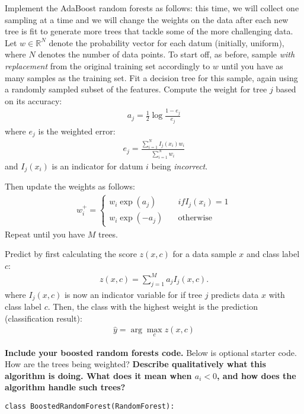 \documentclass[preview]{standalone}
\begin{document}
\begin{Parts}
\Part Implement the AdaBoost random forests as follows: this time, we will collect one sampling at a time and we will change the weights on the data after each new tree is fit to generate more trees that tackle some of the more challenging data. Let $w \in \mathbb{R}^N$ denote the probability vector for each datum (initially, uniform), where $N$ denotes the number of data points. To start off, as before, sample \textit{with replacement} from the original training set accordingly to $w$ until you have as many samples as the training set. Fit a decision tree for this sample, again using a randomly sampled subset of the features. Compute the weight for tree $j$ based on its accuracy:
\begin{align*}
a_j = \frac{1}{2} \log \frac{1-e_j}{e_j}
\end{align*}
where $e_j$ is the weighted error:
\begin{align*} 
e_j = \frac{\sum_{i=1}^N{I_j(x_i) w_i}}{\sum_{i=1}^N{w_i}}
\end{align*} 
and $I_j(x_i)$ is an indicator for datum $i$ being \textit{incorrect}.

Then update the weights as follows:
\begin{align*}
w_i^+ = \begin{cases} w_i \exp(a_j)  & \quad if I_j(x_i) = 1 \\
w_i \exp(-a_j) & \quad \text{otherwise}
\end{cases}
\end{align*}
Repeat until you have $M$ trees.

Predict by first calculating the score $z(x, c)$ for a data sample $x$ and class label $c$:
\begin{align*}
z(x, c) = \sum_{j=1}^M a_j I_{j}(x, c).
\end{align*}
where $I_j(x,c)$ is now an indicator variable for if tree $j$ predicts data $x$ with class label $c$.
Then, the class with the highest weight is the prediction (classification result):
\begin{align*}
\hat{y} = \arg \max_c z(x, c)
\end{align*}

\textbf{Include your boosted random forests code.} Below is optional starter code. How are the trees being weighted? \textbf{Describe qualitatively what this algorithm is doing. What does it mean when $a_i < 0$, and how does the algorithm handle such trees?} 

\begin{verbatim}
class BoostedRandomForest(RandomForest):


\end{verbatim}
\end{Parts}
\end{document}
